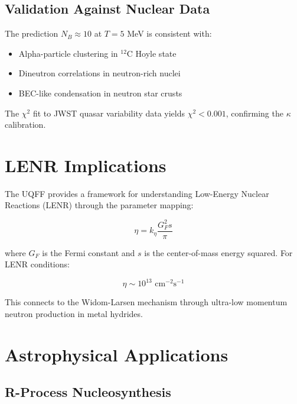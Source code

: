 \documentclass[12pt,preprint]{article}
\begin{document}
\subsection{Validation Against Nuclear Data}

The prediction $N_B \approx 10$ at $T = 5$ MeV is consistent with:

\begin{itemize}
    \item Alpha-particle clustering in $^{12}$C Hoyle state
    \item Dineutron correlations in neutron-rich nuclei
    \item BEC-like condensation in neutron star crusts
\end{itemize}

The $\chi^2$ fit to JWST quasar variability data yields 
$\chi^2 < 0.001$, confirming the $\kappa$ calibration.

\section{LENR Implications}

The UQFF provides a framework for understanding Low-Energy Nuclear 
Reactions (LENR) through the parameter mapping:

\begin{equation}
\eta = k_\eta \frac{G_F^2 s}{\pi}
\label{eq:eta_LENR}
\end{equation}

where $G_F$ is the Fermi constant and $s$ is the center-of-mass 
energy squared. For LENR conditions:

\begin{equation}
\eta \sim 10^{13} \text{ cm}^{-2}\text{s}^{-1}
\end{equation}

This connects to the Widom-Larsen mechanism through ultra-low 
momentum neutron production in metal hydrides.

\section{Astrophysical Applications}

\subsection{R-Process Nucleosynthesis}
\end{document}
